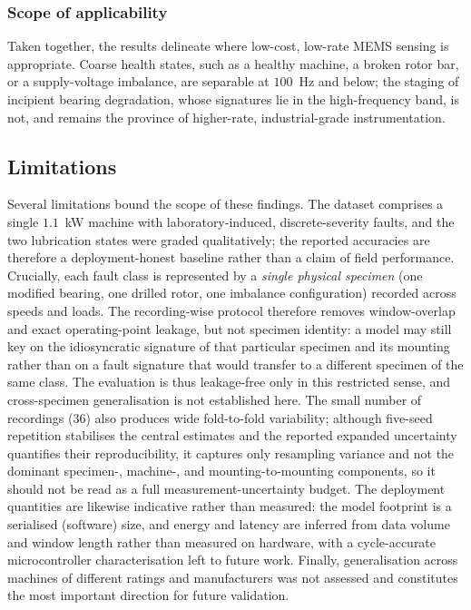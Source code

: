 \subsubsection{Scope of applicability}
Taken together, the results delineate where low-cost, low-rate MEMS sensing is
appropriate. Coarse health states, such as a healthy machine, a broken rotor bar,
or a supply-voltage imbalance, are separable at $100$~Hz and below; the staging of
incipient bearing degradation, whose signatures lie in the high-frequency band, is
not, and remains the province of higher-rate, industrial-grade instrumentation.

\subsection{Limitations}
\label{subsec:limits}
Several limitations bound the scope of these findings. The dataset comprises a
single $1.1$~kW machine with laboratory-induced, discrete-severity faults, and the
two lubrication states were graded qualitatively; the reported accuracies are
therefore a deployment-honest baseline rather than a claim of field performance.
Crucially, each fault class is represented by a \emph{single physical specimen}
(one modified bearing, one drilled rotor, one imbalance configuration) recorded
across speeds and loads. The recording-wise protocol therefore removes
window-overlap and exact operating-point leakage, but not specimen identity: a
model may still key on the idiosyncratic signature of that particular specimen and
its mounting rather than on a fault signature that would transfer to a different
specimen of the same class. The evaluation is thus leakage-free only in this
restricted sense, and cross-specimen generalisation is not established here. The
small number of recordings ($36$) also produces wide fold-to-fold variability;
although five-seed repetition stabilises the central estimates and the reported
expanded uncertainty quantifies their reproducibility, it captures only resampling
variance and not the dominant specimen-, machine-, and mounting-to-mounting
components, so it should not be read as a full measurement-uncertainty budget. The
deployment quantities are likewise indicative rather than measured: the model
footprint is a serialised (software) size, and energy and latency are inferred
from data volume and window length rather than measured on hardware, with a
cycle-accurate microcontroller characterisation left to future work. Finally,
generalisation across machines of different ratings and manufacturers was not
assessed and constitutes the most important direction for future validation.

